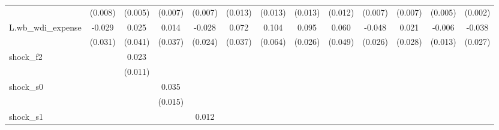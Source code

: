 {\begin{tabular}{l*{12}{c}}
            &     (0.008)         &     (0.005)         &     (0.007)         &     (0.007)         &     (0.013)         &     (0.013)         &     (0.013)         &     (0.012)         &     (0.007)         &     (0.007)         &     (0.005)         &     (0.002)         \\
\addlinespace
L.wb\_wdi\_expense&      -0.029         &       0.025         &       0.014         &      -0.028         &       0.072\sym{*}  &       0.104         &       0.095\sym{***}&       0.060         &      -0.048\sym{*}  &       0.021         &      -0.006         &      -0.038         \\
            &     (0.031)         &     (0.041)         &     (0.037)         &     (0.024)         &     (0.037)         &     (0.064)         &     (0.026)         &     (0.049)         &     (0.026)         &     (0.028)         &     (0.013)         &     (0.027)         \\
\addlinespace
shock\_f2    &                     &       0.023\sym{*}  &                     &                     &                     &                     &                     &                     &                     &                     &                     &                     \\
            &                     &     (0.011)         &                     &                     &                     &                     &                     &                     &                     &                     &                     &                     \\
\addlinespace
shock\_s0    &                     &                     &       0.035\sym{**} &                     &                     &                     &                     &                     &                     &                     &                     &                     \\
            &                     &                     &     (0.015)         &                     &                     &                     &                     &                     &                     &                     &                     &                     \\
\addlinespace
shock\_s1    &                     &                     &                     &       0.012\sym{**} &                     &                     &                     &                     &                     &                     &                     &                     \\

\end{tabular}}
